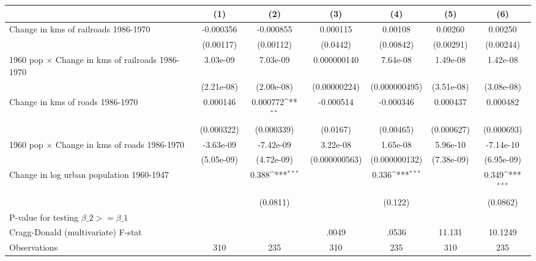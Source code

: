 {
\def\sym#1{\ifmmode^{#1}\else\(^{#1}\)\fi}
\begin{tabular}{l*{6}{c}}
\hline\hline
                &\multicolumn{1}{c}{(1)}&\multicolumn{1}{c}{(2)}&\multicolumn{1}{c}{(3)}&\multicolumn{1}{c}{(4)}&\multicolumn{1}{c}{(5)}&\multicolumn{1}{c}{(6)}\\
\hline
Change in kms of railroads 1986-1970&-0.000356         &-0.000855         & 0.000115         &  0.00108         &  0.00260         &  0.00250         \\
                &(0.00117)         &(0.00112)         & (0.0442)         &(0.00842)         &(0.00291)         &(0.00244)         \\
[1em]
1960 pop $\times$ Change in kms of railroads 1986-1970& 3.03e-09         & 7.03e-09         &0.000000140         & 7.64e-08         & 1.49e-08         & 1.42e-08         \\
                &(2.21e-08)         &(2.00e-08)         &(0.00000224)         &(0.000000495)         &(3.51e-08)         &(3.08e-08)         \\
[1em]
Change in kms of roads 1986-1970& 0.000146         & 0.000772\sym{**} &-0.000514         &-0.000346         & 0.000437         & 0.000482         \\
                &(0.000322)         &(0.000339)         & (0.0167)         &(0.00465)         &(0.000627)         &(0.000693)         \\
[1em]
1960 pop $\times$ Change in kms of roads 1986-1970&-3.63e-09         &-7.42e-09         & 3.22e-08         & 1.65e-08         & 5.96e-10         &-7.14e-10         \\
                &(5.05e-09)         &(4.72e-09)         &(0.000000563)         &(0.000000132)         &(7.38e-09)         &(6.95e-09)         \\
[1em]
Change in log urban population 1960-1947&                  &    0.388\sym{***}&                  &    0.336\sym{***}&                  &    0.349\sym{***}\\
                &                  & (0.0811)         &                  &  (0.122)         &                  & (0.0862)         \\
\hline
P-value for testing $\beta\_{2} >= \beta\_{1}$&                  &                  &                  &                  &                  &                  \\
Cragg-Donald (multivariate) F-stat&                  &                  &    .0049         &    .0536         &   11.131         &  10.1249         \\
Observations    &      310         &      235         &      310         &      235         &      310         &      235         \\
\hline\hline
\end{tabular}
}
